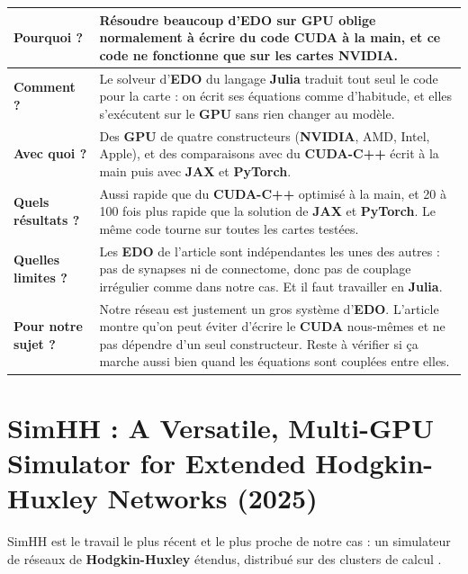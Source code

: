 \medskip
\begin{tabular}{|p{3.2cm}|p{11.2cm}|}
\hline
\textbf{Pourquoi ?} & Résoudre beaucoup d'\textbf{EDO} sur \textbf{GPU} oblige normalement à écrire du code \textbf{CUDA} à la main, et ce code ne fonctionne que sur les cartes \textbf{NVIDIA}. \\ \hline
\textbf{Comment ?} & Le solveur d'\textbf{EDO} du langage \textbf{Julia} traduit tout seul le code pour la carte : on écrit ses équations comme d'habitude, et elles s'exécutent sur le \textbf{GPU} sans rien changer au modèle. \\ \hline
\textbf{Avec quoi ?} & Des \textbf{GPU} de quatre constructeurs (\textbf{NVIDIA}, AMD, Intel, Apple), et des comparaisons avec du \textbf{CUDA-C++} écrit à la main puis avec \textbf{JAX} et \textbf{PyTorch}. \\ \hline
\textbf{Quels résultats ?} & Aussi rapide que du \textbf{CUDA-C++} optimisé à la main, et 20 à 100 fois plus rapide que la solution de \textbf{JAX} et \textbf{PyTorch}. Le même code tourne sur toutes les cartes testées. \\ \hline
\textbf{Quelles limites ?} & Les \textbf{EDO} de l'article sont indépendantes les unes des autres : pas de synapses ni de connectome, donc pas de couplage irrégulier comme dans notre cas. Et il faut travailler en \textbf{Julia}. \\ \hline
\textbf{Pour notre sujet ?} & Notre réseau est justement un gros système d'\textbf{EDO}. L'article montre qu'on peut éviter d'écrire le \textbf{CUDA} nous-mêmes et ne pas dépendre d'un seul constructeur. Reste à vérifier si ça marche aussi bien quand les équations sont couplées entre elles. \\ \hline
\end{tabular}

\section{SimHH : A Versatile, Multi-GPU Simulator for Extended Hodgkin-Huxley Networks (2025)}

SimHH est le travail le plus récent et le plus proche de notre cas : un simulateur de réseaux de \textbf{Hodgkin-Huxley} étendus, distribué sur des clusters de calcul \cite{engelen2025}.

